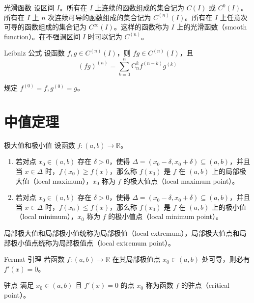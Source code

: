 \begin{definition}{光滑函数}
  设区间 $I$。所有在 $I$ 上连续的函数组成的集合记为 $C(I)$ 或 $C^0(I)$。所有在 $I$ 上 $n$ 次连续可导的函数组成的集合记为 $C^{(n)}(I)$。所有在 $I$ 上任意次可导的函数组成的集合记为 $C^\infty(I)$。这样的函数称为 $I$ 上的光滑函数（smooth function）。在不强调区间 $I$ 时可以记为 $C^{(n)}$。
\end{definition}

\begin{theorem}{Leibniz 公式}
  设函数 $f, g \in C^{(n)}(I)$，则 $fg \in C^{(n)}(I)$，且
  \[(fg)^{(n)} = \sum_{k = 0}^{n} \mathrm{C}_{n}^{k}f^{(n - k)}g^{(k)} \]

  规定 $f^{(0)} = f, g^{(0)} = g$。
\end{theorem}

\section{中值定理}

\begin{definition}{极大值和极小值}
  设函数 $f:(a,b)\to \mathbb{R}$。
  \begin{enumerate}
    \item 若对点 $x_0 \in (a,b)$ 存在 $\delta > 0$，使得 $\Delta = (x_0 - \delta,x_0 + \delta) \subseteq (a,b)$，并且当 $x \in \Delta$ 时，$f(x_0)\geqslant f(x)$，那么称 $f(x_0)$ 是 $f$ 在 $(a,b)$ 上的局部极大值（local maximum），$x_0$ 称为 $f$ 的极大值点（local maximum point）。
    \item 若对点 $x_0 \in (a,b)$ 存在 $\delta > 0$，使得 $\Delta = (x_0 - \delta,x_0 + \delta) \subseteq (a,b)$，并且当 $x \in \Delta$ 时，$f(x_0)\leqslant f(x)$，那么称 $f(x_0)$ 是 $f$ 在 $(a,b)$ 上的极小值（local minimum），$x_0$ 称为 $f$ 的极小值点（local minimum point）。
  \end{enumerate}
  局部极大值和局部极小值统称为局部极值（local extremum），局部极大值点和局部极小值点统称为局部极值点（local extremum point）。
\end{definition}

\begin{theorem}{Fermat 引理}
  若函数 $f:(a,b)\to \mathbb{R}$ 在其局部极值点 $x_0 \in (a,b)$ 处可导，则必有 $f'(x) = 0$。
\end{theorem}

\begin{definition}{驻点}
  满足 $x_0 \in (a,b)$ 且 $f'(x) = 0$ 的点 $x_0$ 称为函数 $f$ 的驻点（critical point）。
\end{definition}

